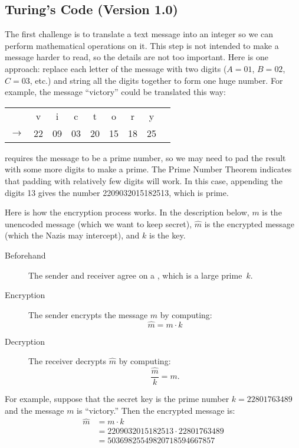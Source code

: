\subsection{Turing's Code (Version 1.0)}

The first challenge is to translate a text message into an integer so
we can perform mathematical operations on it.  This step is not
intended to make a message harder to read, so the details are not too
important.  Here is one approach: replace each letter of the message
with two digits ($A = 01$, $B = 02$, $C = 03$, etc.) and string all
the digits together to form one huge number.  For example, the message
``victory'' could be translated this way:
\begin{center}
\begin{tabular}{ccccccccc}
   &v & i & c & t & o & r & y \\
$\rightarrow$ & 22 & 09 & 03 & 20 &
  15 & 18 & 25
\end{tabular}
\end{center}
 requires the message to be a prime number, so we
may need to pad the result with some more digits to make a prime.  The
Prime Number Theorem indicates that padding with relatively few digits
will work.  In this case, appending the digits 13 gives the number
2209032015182513, which is prime.

Here is how the encryption process works.  In the description below,
$m$ is the unencoded message (which we want to keep secret), $\widehat{m}$ is
the encrypted message (which the Nazis may intercept), and $k$ is the
key.

\begin{description}

\item[Beforehand] The sender and receiver agree on a , which is a large prime~$k$.

\item[Encryption] The sender encrypts the message $m$ by computing:
\[
\widehat{m} = m \cdot k
\]

\item[Decryption] The receiver decrypts $\widehat{m}$ by computing:
\[
\frac{\widehat{m}}{k} = m.
\]

\iffalse = \frac{m \cdot k}{k} \fi

\end{description}

For example, suppose that the secret key is the prime number $k =
22801763489$ and the message $m$ is ``victory.''  Then the encrypted
message is:
\begin{align*}
\widehat{m} & = m \cdot k \\
& = 2209032015182513 \cdot 22801763489 \\
& =
50369825549820718594667857
\end{align*}

